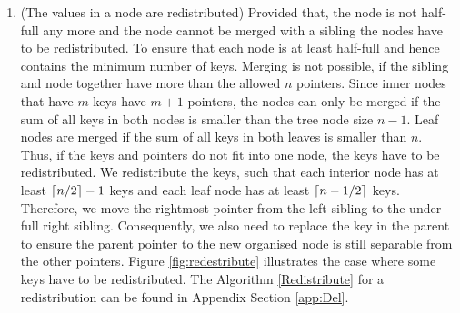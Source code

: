 \documentclass[abstracton,12pt,oneside]{scrreprt}
\DeclarePairedDelimiter\ceil{\lceil}{\rceil}
\begin{document}
\begin{enumerate}
	\item (The values in a node are redistributed) Provided that, the node is not half-full any more and the node cannot be merged with a sibling the nodes have to be redistributed. To ensure that each node is at least half-full and hence contains the minimum number of keys. Merging is not possible, if the sibling and node together have more than the allowed $n$ pointers. Since inner nodes that have $m$ keys have $m+1$ pointers, the nodes can only be merged if the sum of all keys in both nodes is smaller than the tree node size $n-1$. Leaf nodes are merged if the sum of all keys in both leaves is smaller than $n$. Thus, if the keys and pointers do not fit into one node, the keys have to be redistributed. We redistribute the keys, such that each interior node has at least $\ceil{n/2}-1$ keys and each leaf node has at least $\ceil{n-1/2}$ keys. Therefore, we move the rightmost pointer from the left sibling to the under-full right sibling. Consequently, we also need to replace the key in the parent to ensure the parent pointer to the new organised node is still separable from the other pointers. Figure \ref{fig:redestribute} illustrates the case where some keys have to be redistributed. The Algorithm \ref{Redistribute} for a redistribution can be found in Appendix Section \ref{app:Del}.
		\begin{figure}[ht!]
			\centering
\end{figure}
\end{enumerate}
\end{document}
